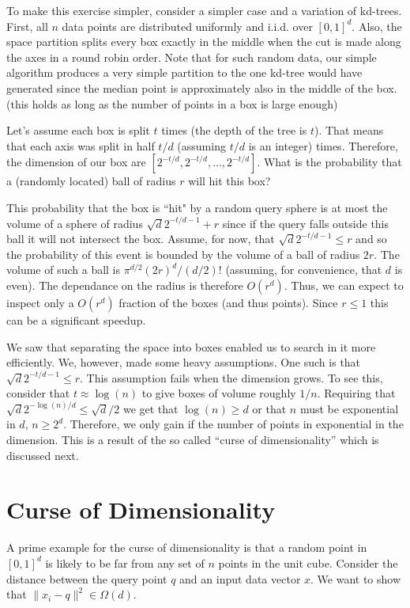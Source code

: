 \documentclass{article}
\begin{document}
To make this exercise simpler, consider a simpler case and a variation of kd-trees.
First, all $n$ data points are distributed uniformly and i.i.d. over $[0,1]^{d}$.
Also, the space partition splits every box exactly in the middle when the cut is
made along the axes in a round robin order.
Note that for such random data, our simple algorithm produces a very simple partition to the
one kd-tree would have generated since the median point is approximately also in the middle of the box.
(this holds as long as the number of points in a box is large enough)

Let's assume each box is split $t$ times (the depth of the tree is $t$). 
That means that each axis was split in half $t/d$ (assuming $t/d$ is an integer) times.
Therefore, the dimension of our box are $[2^{-t/d},2^{-t/d},\ldots,2^{-t/d}]$.
What is the probability that a (randomly located) ball of radius $r$ will hit this box?

This probability that the box is ``hit" by a random query sphere 
is at most the volume of a sphere of radius $\sqrt{d}2^{-t/d-1} + r$ since 
if the query falls outside this ball it will not intersect the box. Assume, for now, that $\sqrt{d}2^{-t/d-1} \le r$ and
so the probability of this event is bounded by the volume of a ball of radius $2r$.
The volume of such a ball is $\pi^{d/2}(2r)^d/(d/2)!$ (assuming, for convenience, that $d$ is even).
The dependance on the radius is therefore $O(r^d)$. Thus, we can expect to inspect only a $O(r^d)$ fraction of the 
boxes (and thus points). Since $r\le 1$ this can be a significant speedup.

We saw that separating the space into boxes enabled us to search in it more efficiently.
We, however, made some heavy assumptions. One such is that $\sqrt{d}2^{-t/d-1} \le r$.
This assumption fails when the dimension grows. To see this, consider that $t \approx \log(n)$ 
to give boxes of volume roughly $1/n$. Requiring that $\sqrt{d}2^{-\log(n)/d} \le \sqrt{d}/2$ we get that $\log(n) \ge d$ or that $n$ must be
exponential in $d$, $n \ge 2^{d}$. Therefore, we only gain if the number of points in exponential in the dimension.
This is a result of the so called ``curse of dimensionality'' which is discussed next.

\section{Curse of Dimensionality}
A prime example for the curse of dimensionality is that a random point in $[0,1]^d$ is likely to be far from any set of $n$ points in the unit cube.
Consider the distance between the query point $q$ and an input data vector $x$.
We want to show that $\|x_i-q\|^2 \in \Omega(d)$.
\end{document}
